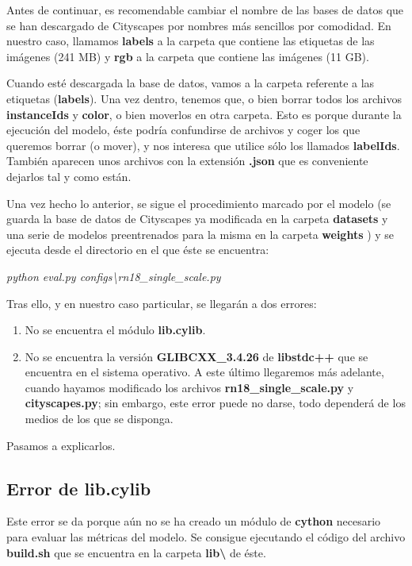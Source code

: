 Antes de continuar, es recomendable cambiar el nombre de las bases de datos que se han descargado de Cityscapes por nombres más sencillos por comodidad. En nuestro caso, llamamos \textbf{labels} a la carpeta que contiene las etiquetas de las imágenes (241 MB) y \textbf{rgb} a la carpeta que contiene las imágenes (11 GB).

Cuando esté descargada la base de datos, vamos a la carpeta referente a las etiquetas (\textbf{labels}). Una vez dentro, tenemos que, o bien borrar todos los archivos \textbf{instanceIds} y \textbf{color}, o bien moverlos en otra carpeta. Esto es porque durante la ejecución del modelo, éste podría confundirse de archivos y coger los que queremos borrar (o mover), y nos interesa que utilice sólo los llamados \textbf{labelIds}. También aparecen unos archivos con la extensión \textbf{.json} que es conveniente dejarlos tal y como están.

Una vez hecho lo anterior, se sigue el procedimiento marcado por el modelo (se guarda la base de datos de Cityscapes ya modificada \cite{cityscapes} en la carpeta \textbf{datasets} y una serie de modelos preentrenados para la misma en la carpeta \textbf{weights} \cite{github_swiftnet}) y se ejecuta desde el directorio en el que éste se encuentra:

\begin{center}
\textit{python eval.py configs\textbackslash{rn18\_single\_scale.py}}
\end{center}

Tras ello, y en nuestro caso particular, se llegarán a dos errores:

\begin{enumerate}
\item No se encuentra el módulo \textbf{lib.cylib}.
\item No se encuentra la versión \textbf{GLIBCXX\_3.4.26} de \textbf{libstdc++} que se encuentra en el sistema operativo. A este último llegaremos más adelante, cuando hayamos modificado los archivos \textbf{rn18\_single\_scale.py} y \textbf{cityscapes.py}; sin embargo, este error puede no darse, todo dependerá de los medios de los que se disponga.
\end{enumerate}

Pasamos a explicarlos.

\subsection{Error de lib.cylib}

Este error se da porque aún no se ha creado un módulo de \textbf{cython} \cite{cython} necesario para evaluar las métricas del modelo. Se consigue ejecutando el código del archivo \textbf{build.sh} que se encuentra en la carpeta \textbf{lib\textbackslash{}} de éste.

